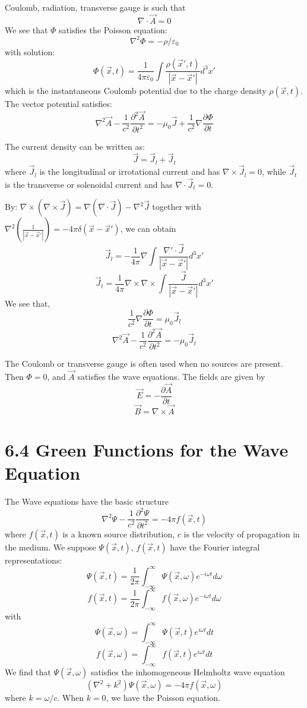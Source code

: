 \documentclass{article}
\begin{document}
	Coulomb, radiation, transverse gauge is such that
	$$ \nabla \cdot \vec{A} = 0 $$
	We see that $\Phi$ satisfies the Poisson equation:
	$$ \nabla^2 \Phi = -\rho / \varepsilon_0 $$
	with solution:
	$$ \Phi(\vec{x}, t) = \frac{1}{4\pi\varepsilon_0} \int \frac{\rho(\vec{x}', t)}{|\vec{x}-\vec{x}'|} d^3x' $$
	which is the instantaneous Coulomb potential due to the charge density $\rho(\vec{x}, t)$.
	The vector potential satisfies:
	$$ \nabla^2 \vec{A} - \frac{1}{c^2} \frac{\partial^2 \vec{A}}{\partial t^2} = -\mu_0 \vec{J} + \frac{1}{c^2} \nabla \frac{\partial \Phi}{\partial t} $$
	
	The current density can be written as:
	$$ \vec{J} = \vec{J}_l + \vec{J}_t $$
	where $\vec{J}_l$ is the longitudinal or irrotational current and has $\nabla \times \vec{J}_l = 0$, while $\vec{J}_t$ is the transverse or solenoidal current and has $\nabla \cdot \vec{J}_t = 0$.
	
	By: $\nabla \times (\nabla \times \vec{J}) = \nabla(\nabla \cdot \vec{J}) - \nabla^2 \vec{J}$ together with $\nabla^2(\frac{1}{|\vec{x}-\vec{x}'|}) = -4\pi\delta(\vec{x}-\vec{x}')$, we can obtain
	$$ \vec{J}_l = -\frac{1}{4\pi} \nabla \int \frac{\nabla' \cdot \vec{J}}{|\vec{x}-\vec{x}'|} d^3x' $$
	$$ \vec{J}_t = \frac{1}{4\pi} \nabla \times \nabla \times \int \frac{\vec{J}}{|\vec{x}-\vec{x}'|} d^3x' $$
	We see that,
	$$ \frac{1}{c^2}\nabla \frac{\partial \Phi}{\partial t} = \mu_0 \vec{J}_l $$
	$$ \nabla^2 \vec{A} - \frac{1}{c^2} \frac{\partial^2 \vec{A}}{\partial t^2} = -\mu_0 \vec{J}_t $$
	
	The Coulomb or transverse gauge is often used when no sources are present.
	Then $\Phi=0$, and $\vec{A}$ satisfies the wave equations.
	The fields are given by
	$$ \vec{E} = -\frac{\partial \vec{A}}{\partial t} $$
	$$ \vec{B} = \nabla \times \vec{A} $$
	\section*{6.4 Green Functions for the Wave Equation}
	
	The Wave equations have the basic structure
	$$ \nabla^2 \Psi - \frac{1}{c^2} \frac{\partial^2 \Psi}{\partial t^2} = -4\pi f(\vec{x}, t) $$
	where $f(\vec{x}, t)$ is a known source distribution, $c$ is the velocity of propagation in the medium. We suppose $\Psi(\vec{x}, t)$, $f(\vec{x}, t)$ have the Fourier integral representations:
	$$ \Psi(\vec{x}, t) = \frac{1}{2\pi} \int_{-\infty}^{\infty} \Psi(\vec{x}, \omega) e^{-i\omega t} d\omega $$
	$$ f(\vec{x}, t) = \frac{1}{2\pi} \int_{-\infty}^{\infty} f(\vec{x}, \omega) e^{-i\omega t} d\omega $$
	with
	$$ \Psi(\vec{x}, \omega) = \int_{-\infty}^{\infty} \Psi(\vec{x}, t) e^{i\omega t} dt $$
	$$ f(\vec{x}, \omega) = \int_{-\infty}^{\infty} f(\vec{x}, t) e^{i\omega t} dt $$
	We find that $\Psi(\vec{x}, \omega)$ satisfies the inhomogeneous Helmholtz wave equation
	$$ (\nabla^2 + k^2) \Psi(\vec{x}, \omega) = -4\pi f(\vec{x}, \omega) $$
	where $k = \omega/c$.
	When $k=0$, we have the Poisson equation.
	
\end{document}
